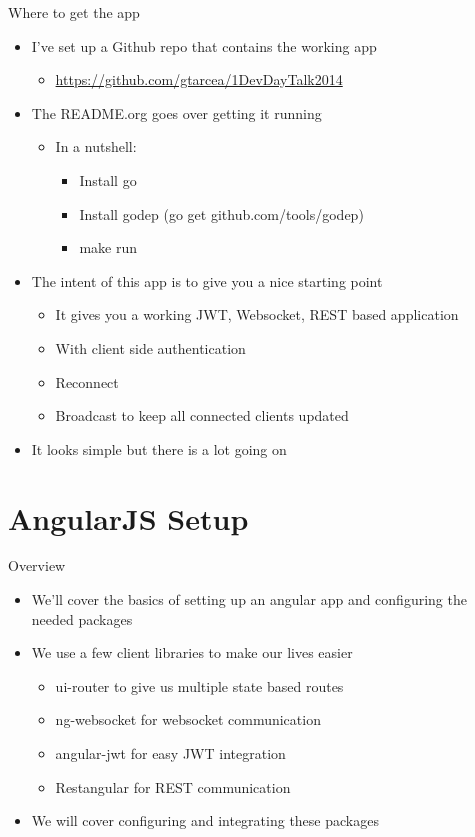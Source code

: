 \documentclass[presentation]{beamer}
\begin{document}
\begin{frame}[label=sec-1-5]{Where to get the app}
\begin{itemize}
\item I've set up a Github repo that contains the working app
\begin{itemize}
\item \url{https://github.com/gtarcea/1DevDayTalk2014}
\end{itemize}
\item The README.org goes over getting it running
\begin{itemize}
\item In a nutshell:
\begin{itemize}
\item Install go
\item Install godep (go get github.com/tools/godep)
\item make run
\end{itemize}
\end{itemize}
\item The intent of this app is to give you a nice starting point
\begin{itemize}
\item It gives you a working JWT, Websocket, REST based application
\item With client side authentication
\item Reconnect
\item Broadcast to keep all connected clients updated
\end{itemize}
\item It looks simple but there is a lot going on
\end{itemize}
\end{frame}

\section{AngularJS Setup}
\label{sec-2}

\begin{frame}[label=sec-2-1]{Overview}
\begin{itemize}
\item We'll cover the basics of setting up an angular app and configuring the needed packages
\item We use a few client libraries to make our lives easier
\begin{itemize}
\item ui-router to give us multiple state based routes
\item ng-websocket for websocket communication
\item angular-jwt for easy JWT integration
\item Restangular for REST communication
\end{itemize}
\item We will cover configuring and integrating these packages
\end{itemize}
\end{frame}
\end{document}
